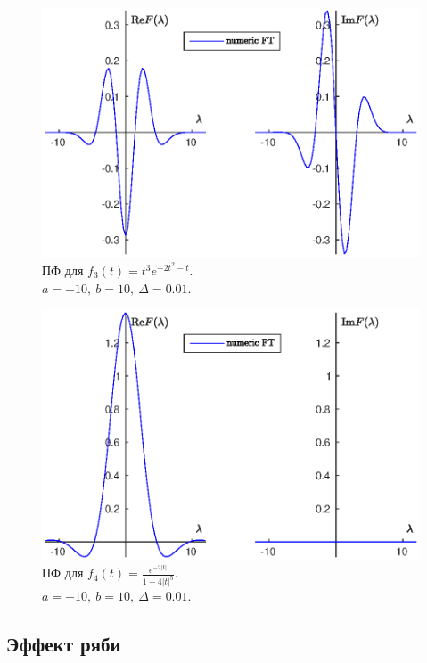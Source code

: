 \documentclass[12pt, a4paper]{article} %
\begin{document}
\begin{figure}[b]
    \centering
    \includegraphics[width=\textwidth]{figures/func3.eps}
    \caption{ПФ для $f_3(t) = t^3 e^{-2t^2-t}$.\\
    $a = -10,\ b = 10,\ \Delta = 0.01$.}
    \label{fig:func3}
\end{figure}

\begin{figure}[b]
    \centering
    \includegraphics[width=\textwidth]{figures/func4.eps}
    \caption{ПФ для $f_4(t) =
        \frac{e^{-2\lvert t \rvert }}{1 + 4\left\lvert t \right\rvert ^{5}}$.\\
    $a = -10,\ b = 10,\ \Delta = 0.01$.}
    \label{fig:func4}
\end{figure}

\subsection{Эффект ряби}
\end{document}
